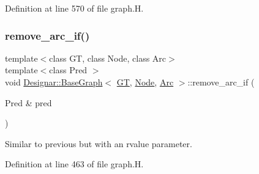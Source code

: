 Definition at line 570 of file graph.\+H.

\mbox{\label{class_designar_1_1_base_graph_a9c97f2759a2847e61e17dc2806172758}} 
\subsubsection{\texorpdfstring{remove\+\_\+arc\+\_\+if()}{remove\_arc\_if()}\hspace{0.1cm}{\footnotesize\ttfamily [1/2]}}
{\footnotesize\ttfamily template$<$class GT, class Node, class Arc$>$ \\
template$<$class Pred $>$ \\
void \hyperlink{class_designar_1_1_base_graph}{Designar\+::\+Base\+Graph}$<$ \hyperlink{demo-buildgraph_8_c_a3001c40d2c31ca87ed96cd7d1334a55e}{GT}, \hyperlink{namespace_designar_a5af326c65aa2bd26b26c410f2030d09e}{Node}, \hyperlink{namespace_designar_a3f55fb5513d62ff47cbc8f72b8e95d6f}{Arc} $>$\+::remove\+\_\+arc\+\_\+if (\begin{DoxyParamCaption}\item[{Pred \&}]{pred }\end{DoxyParamCaption})\hspace{0.3cm}{\ttfamily [inline]}}



Similar to previous but with an rvalue parameter. 



Definition at line 463 of file graph.\+H.

\mbox{\label{class_designar_1_1_base_graph_a0e516bee6e0247de6bdd207de57caad6}} 
